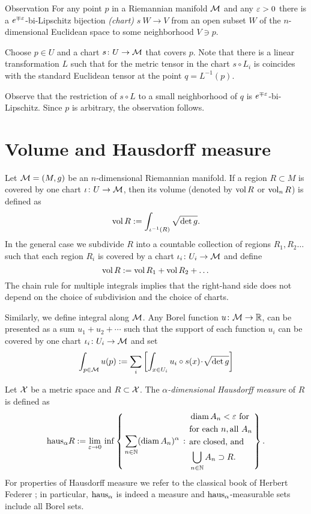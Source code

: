 \begin{thm}{Observation}\label{obs:lip-chart}
For any point $p$ in a Riemannian manifold $\mathcal{M}$ and any $\varepsilon>0$ there is a $e^{\mp\varepsilon}$-bi-Lipschitz bijection \emph{(chart)} $s\:W\to V$ from an open subset $W$ of the $n$-dimensional Euclidean space to some neighborhood $V\ni p$.
\end{thm}

Choose $p\in U$ and a chart $s\colon U\to \mathcal{M}$ that covers $p$.
Note that there is a linear transformation $L$ such that for the metric tensor in the chart $s\circ L_i$ is coincides with the standard Euclidean tensor at the point $q=L^{-1}(p)$.

Observe that the restriction of $s\circ L$ to a small neighborhood of $q$ is $e^{\mp\varepsilon}$-bi-Lipschitz.
Since $p$ is arbitrary, the observation follows.
\qeds

\section{Volume and Hausdorff measure}\label{sec:vol-haus}

Let $\mathcal{M}=(M,g)$ be an $n$-dimensional Riemannian manifold.
If a region $R\subset M$ is covered by one chart $\iota\colon U\to \mathcal{M}$,
then its volume (denoted by $\operatorname{\rm vol}\nolimits R$ or $\operatorname{\rm vol}\nolimits_n R$) is defined as 
\[\operatorname{\rm vol}\nolimits R
\mathrel{:=}
\int_{\iota^{-1}(R)}\sqrt{\det{g}}.\]
In the general case we subdivide $R$ into a countable collection of regions $R_1,R_2\dots$ such that each region $R_i$ is covered by a chart $\iota_i\colon U_i\to \mathcal{M}$ and define
\[\operatorname{\rm vol}\nolimits R\mathrel{:=} \operatorname{\rm vol}\nolimits R_1+\operatorname{\rm vol}\nolimits R_2+\dots\]
The chain rule for multiple integrals implies that the right-hand side does not depend on the choice of subdivision and the choice of charts.

Similarly, we define integral along $\mathcal{M}$.
Any Borel function $u\:\spc{M}\z\to \RR$, can be presented as a sum $u_1+u_2+\cdots$ such that the support of each function $u_i$ can be covered by one chart $\iota_i\colon U_i\to \mathcal{M}$
and set 
\[\int_{p\in\spc{M}} u(p)
\df
\sum_i\left[\int_{x\in U_i} u_i\circ s(x)\cdot\sqrt{\det{g}}\right]
\]

Let $\mathcal{X}$ be a metric space and $R\subset \mathcal{X}$.
The \emph{$\alpha$-dimensional Hausdorff measure} of $R$ is defined as 
$$\mathrm{haus}_\alpha R
\mathrel{:=}
\lim_{\varepsilon\to0}
\,
\inf
\left\{\,{\sum_{n\in\mathbb{N}}(\operatorname{\rm diam}\nolimits A_n)^\alpha}\,:\,{\begin{aligned}
&\operatorname{\rm diam}\nolimits A_n<\varepsilon\ \text{for}
\\
&\text{for each}\ n,\text{all}\  A_n
\\
&\text{are closed, and} 
\\
& \bigcup_{n\in\mathbb{N}}A_n\supset R.
\end{aligned}
}\,\right\}.$$
For properties of Hausdorff measure we refer to the classical book of  Herbert Federer \cite{federer};
in particular, $\mathrm{haus}_\alpha$ is indeed a measure and $\mathrm{haus}_\alpha$-measurable sets include all Borel sets.

